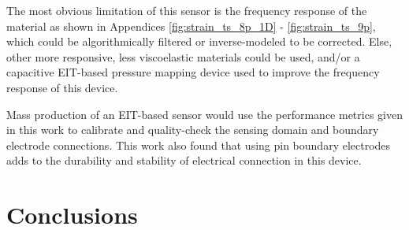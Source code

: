 The most obvious limitation of this sensor is the frequency response of the material as shown in Appendices \ref{fig:strain_ts_8p_1D} - \ref{fig:strain_ts_9p}, which could be algorithmically filtered or inverse-modeled to be corrected. Else, other more responsive, less viscoelastic materials could be used, and/or a capacitive EIT-based pressure mapping device used to improve the frequency response of this device.

Mass production of an EIT-based sensor would use the performance metrics given in this work to calibrate and quality-check the sensing domain and boundary electrode connections. This work also found that using pin boundary electrodes adds to the durability and stability of electrical connection in this device.



\section{Conclusions}\label{sec:Summary and Conclusions}

